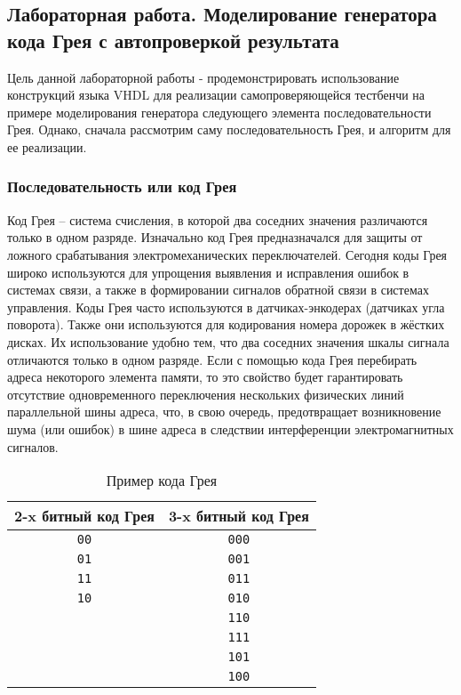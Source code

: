 \subsection{Лабораторная работа. Моделирование генератора кода Грея с автопроверкой результата}

Цель данной лабораторной работы - продемонстрировать использование конструкций языка VHDL для реализации самопроверяющейся тестбенчи на примере моделирования генератора следующего элемента последовательности Грея. Однако, сначала рассмотрим саму последовательность Грея, и алгоритм для ее реализации.

\subsubsection{Последовательность или код Грея}
 
Код Грея – система счисления, в которой два соседних значения различаются только в одном разряде. Изначально код Грея предназначался для защиты от ложного срабатывания электромеханических переключателей. Сегодня коды Грея широко используются для упрощения выявления и исправления ошибок в системах связи, а также в формировании сигналов обратной связи в системах управления. Коды Грея часто используются в датчиках-энкодерах (датчиках угла поворота). Также они используются для кодирования номера дорожек в жёстких дисках. Их использование удобно тем, что два соседних значения шкалы сигнала отличаются только в одном разряде. Если с помощью кода Грея перебирать адреса некоторого элемента памяти, то это свойство будет гарантировать отсутствие одновременного переключения нескольких физических линий параллельной шины адреса, что, в свою очередь, предотвращает возникновение шума (или ошибок) в шине адреса в следствии интерференции электромагнитных сигналов.  

\begin{table}[h]
\centering
\begin{tabular}{|c|c|}
\hline
2-x битный код Грея & 3-x битный код Грея   \\ \hline
\texttt{00} & \texttt{000} \\
\texttt{01} & \texttt{001} \\
\texttt{11} & \texttt{011} \\
\texttt{10} & \texttt{010} \\
 & \texttt{110} \\
 & \texttt{111} \\
 & \texttt{101} \\
 & \texttt{100} \\

\hline
\end{tabular}\par
\caption{Пример кода Грея}
\label{grey_code_table_0}
\end{table}

